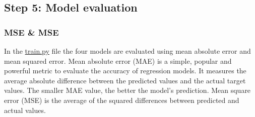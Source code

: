 \documentclass{article}
\begin{document}
\begin{Shaded}
\begin{Highlighting}[]
\OperatorTok{=}
\OperatorTok{=}
\OperatorTok{=}
    \NormalTok{(}\SpecialCharTok{\{}\SpecialCharTok{\}}\SpecialCharTok{\{}\SpecialCharTok{\}}\SpecialStringTok{\textquotesingle{}}\NormalTok{)}

     \NormalTok{(}\SpecialCharTok{\{}\NormalTok{, }\NormalTok{)}\SpecialCharTok{\}}\NormalTok{, }\NormalTok{) }
\end{Highlighting}
\end{Shaded}

\subsection{Step 5: Model evaluation}\label{step-5-model-evaluation}

\subsubsection{MSE \& MSE}\label{mse-mse}

In the \href{/Task_2/train.py}{train.py} file the four models are
evaluated using mean absolute error and mean squared error. Mean
absolute error (MAE) is a simple, popular and powerful metric to
evaluate the accuracy of regression models. It measures the average
absolute difference between the predicted values and the actual target
values. The smaller MAE value, the better the model's prediction. Mean
square error (MSE) is the average of the squared differences between
predicted and actual values.
\end{document}
